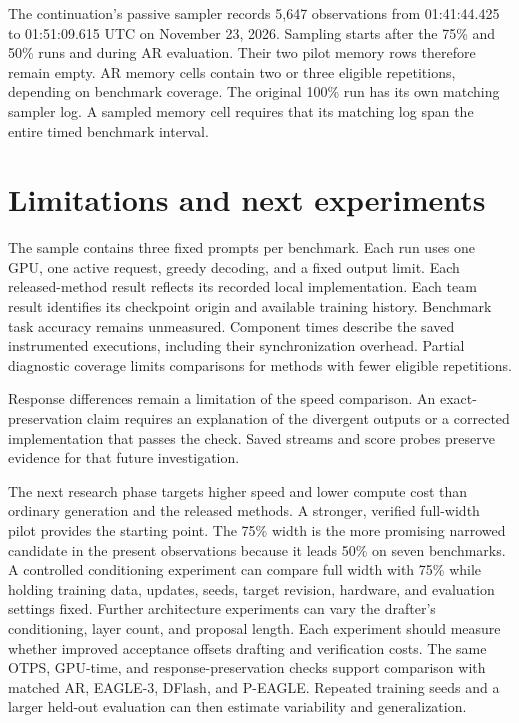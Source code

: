 \documentclass[conference,onecolumn]{IEEEtran}
\begin{document}
The continuation's passive sampler records 5,647 observations from 01:41:44.425 to 01:51:09.615 UTC on November 23, 2026. Sampling starts after the 75\% and 50\% runs and during AR evaluation. Their two pilot memory rows therefore remain empty. AR memory cells contain two or three eligible repetitions, depending on benchmark coverage. The original 100\% run has its own matching sampler log. A sampled memory cell requires that its matching log span the entire timed benchmark interval.

\section{Limitations and next experiments}
The sample contains three fixed prompts per benchmark. Each run uses one GPU, one active request, greedy decoding, and a fixed output limit. Each released-method result reflects its recorded local implementation. Each team result identifies its checkpoint origin and available training history. Benchmark task accuracy remains unmeasured. Component times describe the saved instrumented executions, including their synchronization overhead. Partial diagnostic coverage limits comparisons for methods with fewer eligible repetitions.

Response differences remain a limitation of the speed comparison. An exact-preservation claim requires an explanation of the divergent outputs or a corrected implementation that passes the check. Saved streams and score probes preserve evidence for that future investigation.

The next research phase targets higher speed and lower compute cost than ordinary generation and the released methods. A stronger, verified full-width pilot provides the starting point. The 75\% width is the more promising narrowed candidate in the present observations because it leads 50\% on seven benchmarks. A controlled conditioning experiment can compare full width with 75\% while holding training data, updates, seeds, target revision, hardware, and evaluation settings fixed. Further architecture experiments can vary the drafter's conditioning, layer count, and proposal length. Each experiment should measure whether improved acceptance offsets drafting and verification costs. The same OTPS, GPU-time, and response-preservation checks support comparison with matched AR, EAGLE-3, DFlash, and P-EAGLE. Repeated training seeds and a larger held-out evaluation can then estimate variability and generalization.
\end{document}
